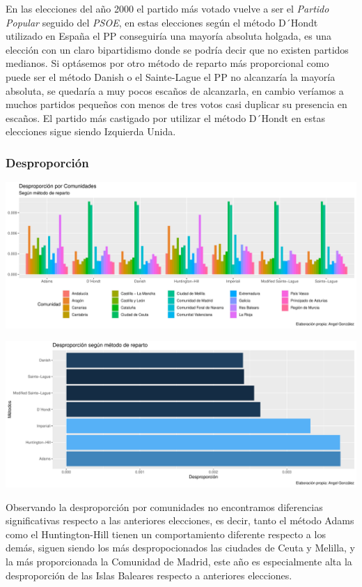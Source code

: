 \documentclass[12pt,a4paper,]{book}
\numberwithin{dummy}{section}
\theoremstyle{ocrenumbox}
\theoremstyle{blacknumex}
\theoremstyle{blacknumbox}
\theoremstyle{ocrenum}
\theoremstyle{ocrenum}
\begin{document}
En las elecciones del año 2000 el partido más votado vuelve a ser el
\emph{Partido Popular} seguido del \emph{PSOE}, en estas elecciones
según el método D´Hondt utilizado en España el PP conseguiría una
mayoría absoluta holgada, es una elección con un claro bipartidismo
donde se podría decir que no existen partidos medianos. Si optásemos por
otro método de reparto más proporcional como puede ser el método Danish
o el Sainte-Lague el PP no alcanzaría la mayoría absoluta, se quedaría a
muy pocos escaños de alcanzarla, en cambio veríamos a muchos partidos
pequeños con menos de tres votos casi duplicar su presencia en escaños.
El partido más castigado por utilizar el método D´Hondt en estas
elecciones sigue siendo Izquierda Unida.

\hypertarget{desproporciuxf3n-7}{%
\subsubsection{Desproporción}\label{desproporciuxf3n-7}}

\begin{center}\includegraphics[width=0.95\linewidth]{figurasR/unnamed-chunk-126-1} \end{center}

\begin{center}\includegraphics[width=0.95\linewidth]{figurasR/unnamed-chunk-126-2} \end{center}

Observando la desproporción por comunidades no encontramos diferencias
significativas respecto a las anteriores elecciones, es decir, tanto el
método Adams como el Huntington-Hill tienen un comportamiento diferente
respecto a los demás, siguen siendo los más despropocionados las
ciudades de Ceuta y Melilla, y la más proporcionada la Comunidad de
Madrid, este año es especialmente alta la desproporción de las Islas
Baleares respecto a anteriores elecciones.
\end{document}
